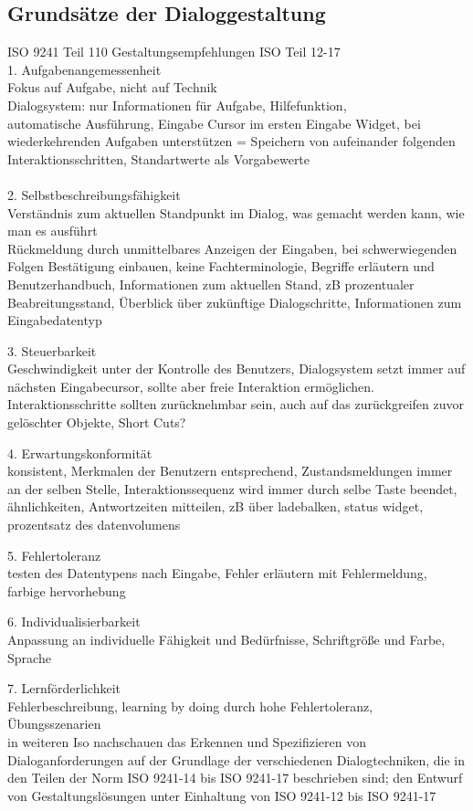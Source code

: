 \subsection{Grundsätze der Dialoggestaltung}
 ISO 9241 Teil 110
 Gestaltungsempfehlungen ISO Teil 12-17
\\
 1. Aufgabenangemessenheit\\
 	Fokus auf Aufgabe, nicht auf Technik\\
 	Dialogsystem: nur Informationen für Aufgabe, Hilfefunktion, \\automatische Ausführung, Eingabe Cursor im ersten Eingabe Widget, bei wiederkehrenden Aufgaben unterstützen = Speichern von aufeinander folgenden Interaktionsschritten, Standartwerte als Vorgabewerte\\
\\
 2. Selbstbeschreibungsfähigkeit\\
    Verständnis zum aktuellen Standpunkt im Dialog, was gemacht werden kann, wie man es ausführt\\
    Rückmeldung durch unmittelbares Anzeigen der Eingaben, bei schwerwiegenden Folgen Bestätigung einbauen, keine Fachterminologie, Begriffe erläutern und Benutzerhandbuch, Informationen zum aktuellen Stand, zB prozentualer Beabreitungsstand, Überblick über zukünftige Dialogschritte, Informationen zum Eingabedatentyp

 3. Steuerbarkeit\\
 	Geschwindigkeit unter der Kontrolle des Benutzers, Dialogsystem setzt immer auf nächsten Eingabecursor, sollte aber freie Interaktion ermöglichen. Interaktionsschritte sollten zurücknehmbar sein, auch auf das zurückgreifen zuvor gelöschter Objekte, Short Cuts?

 4. Erwartungskonformität\\
 	konsistent, Merkmalen der Benutzern entsprechend, Zustandsmeldungen immer an der selben Stelle, Interaktionssequenz wird immer durch selbe Taste beendet, ähnlichkeiten, Antwortzeiten mitteilen, zB über ladebalken, status widget, prozentsatz des datenvolumens

 5. Fehlertoleranz\\
 	testen des Datentypens nach Eingabe, Fehler erläutern mit Fehlermeldung, farbige hervorhebung 

 6. Individualisierbarkeit\\
 	Anpassung an individuelle Fähigkeit und Bedürfnisse, Schriftgröße und Farbe, Sprache

 7. Lernförderlichkeit\\
 	Fehlerbeschreibung, learning by doing durch hohe Fehlertoleranz, Übungsszenarien\\

 	in weiteren Iso nachschauen
 	das Erkennen und Spezifizieren von Dialoganforderungen auf der Grundlage der verschiedenen Dialogtechniken, die in den Teilen der Norm ISO 9241-14 bis ISO 9241-17 beschrieben sind;
 den Entwurf von Gestaltungslösungen unter Einhaltung von ISO 9241-12 bis ISO 9241-17\\


 



